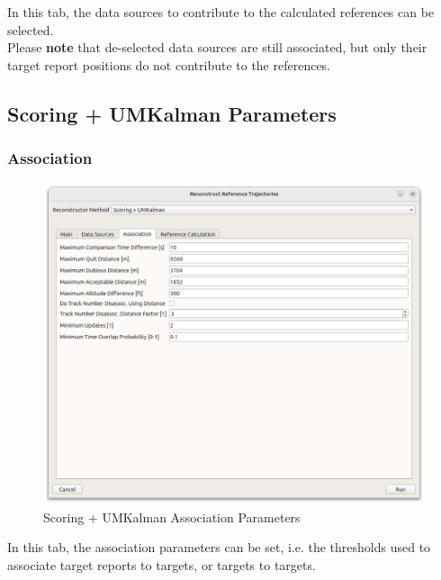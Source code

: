 In this tab, the data sources to contribute to the calculated references can be selected. \\

Please \textbf{note} that de-selected data sources are still associated, but only their target report positions do not contribute to the references.

\subsection{Scoring + UMKalman Parameters}

\subsubsection{Association}

\begin{figure}[H]
    \center
      \includegraphics[width=16cm]{figures/dialog_scorum_assoc.png}
    \caption{Scoring + UMKalman Association Parameters}
\end{figure}

In this tab, the association parameters can be set, i.e. the thresholds used to associate target reports to targets, or targets to targets. \\

